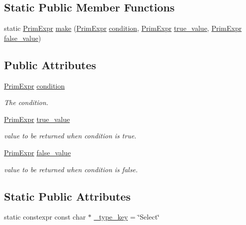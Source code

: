 \subsection*{Static Public Member Functions}
\begin{DoxyCompactItemize}
\item 
static \hyperlink{classtvm_1_1PrimExpr}{Prim\+Expr} \hyperlink{classtvm_1_1tir_1_1SelectNode_ae0809a88c56d20faceba05184b6e793b}{make} (\hyperlink{classtvm_1_1PrimExpr}{Prim\+Expr} \hyperlink{classtvm_1_1tir_1_1SelectNode_a1f737b98d39e78cb59d10ce6db585d20}{condition}, \hyperlink{classtvm_1_1PrimExpr}{Prim\+Expr} \hyperlink{classtvm_1_1tir_1_1SelectNode_a35e913f542bd1231b92adfc2d58938ef}{true\+\_\+value}, \hyperlink{classtvm_1_1PrimExpr}{Prim\+Expr} \hyperlink{classtvm_1_1tir_1_1SelectNode_ac1b3f0f013b6a41a483c6d81397a6dac}{false\+\_\+value})
\end{DoxyCompactItemize}
\subsection*{Public Attributes}
\begin{DoxyCompactItemize}
\item 
\hyperlink{classtvm_1_1PrimExpr}{Prim\+Expr} \hyperlink{classtvm_1_1tir_1_1SelectNode_a1f737b98d39e78cb59d10ce6db585d20}{condition}
\begin{DoxyCompactList}\small\item\em The condition. \end{DoxyCompactList}\item 
\hyperlink{classtvm_1_1PrimExpr}{Prim\+Expr} \hyperlink{classtvm_1_1tir_1_1SelectNode_a35e913f542bd1231b92adfc2d58938ef}{true\+\_\+value}
\begin{DoxyCompactList}\small\item\em value to be returned when condition is true. \end{DoxyCompactList}\item 
\hyperlink{classtvm_1_1PrimExpr}{Prim\+Expr} \hyperlink{classtvm_1_1tir_1_1SelectNode_ac1b3f0f013b6a41a483c6d81397a6dac}{false\+\_\+value}
\begin{DoxyCompactList}\small\item\em value to be returned when condition is false. \end{DoxyCompactList}\end{DoxyCompactItemize}
\subsection*{Static Public Attributes}
\begin{DoxyCompactItemize}
\item 
static constexpr const char $\ast$ \hyperlink{classtvm_1_1tir_1_1SelectNode_a5477e636bc4c0a26627cc9fc76c87cff}{\+\_\+type\+\_\+key} = \char`\"{}Select\char`\"{}
\end{DoxyCompactItemize}


